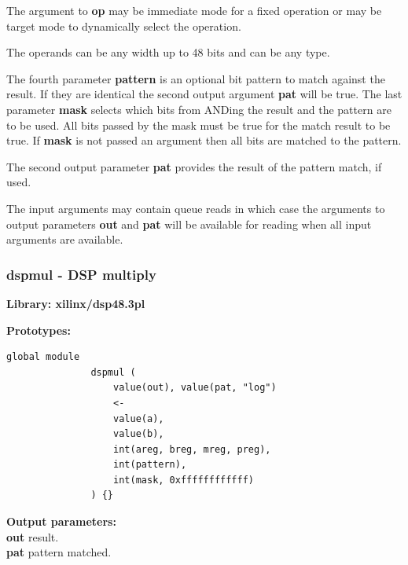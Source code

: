             The argument to {\bf op} may be immediate mode for a fixed
            operation or may be target mode to dynamically select the
            operation.

            The operands can be any width up to 48 bits and can be any type.

            The fourth parameter {\bf pattern} is an optional bit pattern to
            match against the result. If they are identical the second
            output argument {\bf pat} will be true. The last parameter
            {\bf mask} selects which bits from ANDing the result and the pattern
            are to be used. All bits passed by the mask must be true for the
            match result to be true. If {\bf mask} is not passed an argument
            then all bits are matched to the pattern.

            The second output parameter {\bf pat} provides the result of the
            pattern match, if used.

            The input arguments may contain queue reads in which case the
            arguments to output parameters {\bf out} and {\bf pat} will
            be available for reading when all input arguments are
            available.




        \subsubsection{dspmul - DSP multiply}\label{sec:lmdspmul}

            {\bf Library: xilinx/dsp48.3pl}

            {\bf Prototypes:} \\
            \vsp
            \begin{lstlisting}[gobble=12, language=threepl]
               global module
               dspmul (
                   value(out), value(pat, "log")
                   <-
                   value(a),
                   value(b),
                   int(areg, breg, mreg, preg),
                   int(pattern),
                   int(mask, 0xffffffffffff)
               ) {}
            \end{lstlisting}

            {\bf Output parameters:} \\
            {\bf out} result.\\
            {\bf pat} pattern matched.\\


